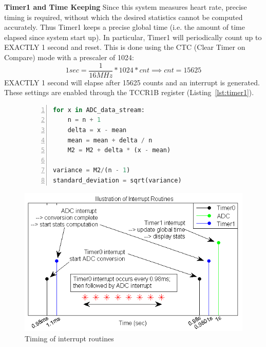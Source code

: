 \documentclass[11pt]{article}
\renewcommand\part[1]{\vspace{.10in}\textbf{#1}}
\begin{document}
\part{Timer1 and Time Keeping} \newline
Since this system measures heart rate, precise timing is required, without which the desired statistics cannot be computed accurately. Thus Timer1 keeps a precise global time (i.e. the amount of time elapsed since system start up). In particular, Timer1 will periodically count up to EXACTLY 1 second and reset. This is done using the CTC (Clear Timer on Compare) mode with a prescaler of 1024:
\begin{equation*}
1sec = \frac{1}{16MHz} * 1024 * cnt \implies cnt = 15625
\end{equation*}
EXACTLY 1 second will elapse after 15625 counts and an interrupt is generated. These settings are enabled through the TCCR1B register (Listing~\ref{lst:timer1}).
%
\begin{figure}[H]
\begin{minipage}{0.5\textwidth}
\centering
\begin{lstlisting}[language=Python, numbers=left, stepnumber=1, caption=Knuth Algorithm, label=lst:knuth]
for x in ADC_data_stream:
    n = n + 1
    delta = x - mean
    mean = mean + delta / n
    M2 = M2 + delta * (x - mean)

variance = M2/(n - 1)
standard_deviation = sqrt(variance)
\end{lstlisting}
\end{minipage}
%
\begin{minipage}{0.5\textwidth}
\centering
\includegraphics[width=\textwidth]{figs/interrupt.png}
\caption{Timing of interrupt routines}
\label{fig:interrupt}
\end{minipage}
\end{figure}
%
\end{document}

